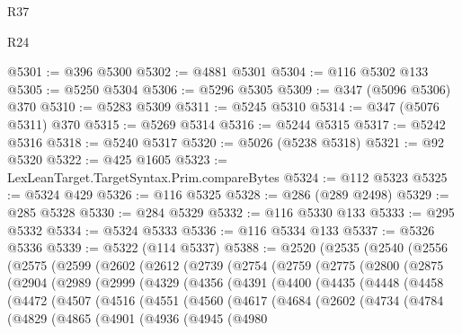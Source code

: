 \begin{lexlean}{R37}
\begin{lexlean}{R24}
\begin{coremodule}
{{{{{{{{{{{{{{{{{{{{{{{{{{{{{{{{{{{{{{{{{{{{{{{{{{{{{{{{{{{{{{{{{{{{{{{{{{{{{{{{{{{{{{{{{{{{{{{{{{{{{{{{{{{{{{{{{{{{{{{{{{{{{{{{{{{{{{{{{{{{{{{{{{{{{{{{{{{{{{{{{{{{{{{{{{{{{{{{{{{{{{{{{@5301 := @396 @5300
@5302 := @4881 @5301
@5304 := @116 @5302 @133
@5305 := @5250 @5304
@5306 := @5296 @5305
@5309 := @347 (@5096 @5306) @370
@5310 := @5283 @5309
@5311 := @5245 @5310
@5314 := @347 (@5076 @5311) @370
@5315 := @5269 @5314
@5316 := @5244 @5315
@5317 := @5242 @5316
@5318 := @5240 @5317
@5320 := @5026 (@5238 @5318)
@5321 := @92 @5320
@5322 := @425 @1605
@5323 := LexLeanTarget.TargetSyntax.Prim.compareBytes
@5324 := @112 @5323
@5325 := @5324 @429
@5326 := @116 @5325
@5328 := @286 (@289 @2498)
@5329 := @285 @5328
@5330 := @284 @5329
@5332 := @116 @5330 @133
@5333 := @295 @5332
@5334 := @5324 @5333
@5336 := @116 @5334 @133
@5337 := @5326 @5336
@5339 := @5322 (@114 @5337)
@5388 := @2520
    (@2535
      (@2540
        (@2556
          (@2575
            (@2599
              (@2602
                (@2612
                  (@2739
                    (@2754
                      (@2759
                        (@2775
                          (@2800
                            (@2875
                              (@2904
                                (@2989
                                  (@2999
                                    (@4329
                                      (@4356
                                        (@4391
                                          (@4400
                                            (@4435
                                              (@4448
                                                (@4458
                                                  (@4472
                                                    (@4507
                                                      (@4516
                                                        (@4551
                                                          (@4560
                                                            (@4617
                                                              (@4684
                                                                (@2602
                                                                  (@4734
                                                                    (@4784
                                                                      (@4829
                                                                        (@4865
                                                                          (@4901
                                                                            (@4936
                                                                              (@4945
                                                                                (@4980
}}}}}}}}}}}}}}}}}}}}}}}}}}}}}}}}}}}}}}}}}}}}}}}}}}}}}}}}}}}}}}}}}}}}}}}}}}}}}}}}}}}}}}}}}}}}}}}}}}}}}}}}}}}}}}}}}}}}}}}}}}}}}}}}}}}}}}}}}}}}}}}}}}}}}}}}}}}}}}}}}}}}}}}}}}}}}}}}}}}}}}}}}
\end{coremodule}
\end{lexlean}
\end{lexlean}
